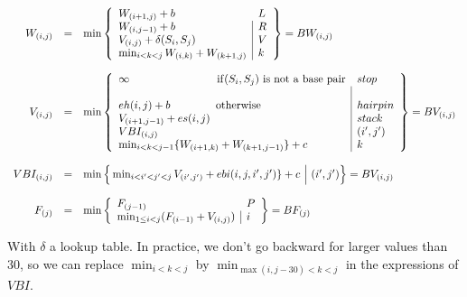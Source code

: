 \[\begin{array}{rcl}
W_{(i,j)}&=&\min\left\{\begin{array}{l|l}
	W_{(i+1,j)}+b & L\\
	W_{(i,j-1)}+b & R\\
	V_{(i,j)}+\delta(S_i,S_j) & V \\
	\min_{i<k<j}W_{(i,k)}+W_{(k+1,j)} &k
\end{array}\right\} = BW_{(i,j)}\\
\\
V_{(i,j)}&=&\min\left\{\begin{array}{l|l}
	\infty \qquad\qquad\qquad\qquad {\rm if}(S_i,S_j) \text{ is not a base pair} & stop\\\\
	eh(i,j)+b \qquad\qquad\, \text{otherwise} & hairpin\\
	V_{(i+1,j-1)}+es(i,j) & stack \\
	VBI_{(i,j)} & (i',j') \\
	\min_{i<k<j-1}\{W_{(i+1,k)}+W_{(k+1,j-1)}\} +c & k
\end{array}\right\} = BV_{(i,j)}\\
\\
VBI_{(i,j)}&=&\min\Big\{\min_{i<i'<j'<j}V_{(i',j')}+ebi(i,j,i',j')\} +c \,\,\Big|\,\, (i',j') \Big\}=BV_{(i,j)}\\
\\
F_{(j)}&=&\min\left\{\begin{array}{l|l}
	F_{(j-1)} & P \\ 
	\min_{1\le i< j} (F_{(i-1)} + V_{(i,j)}) & i
\end{array}\right\} = BF_{(j)}
\end{array}\]

With $\delta$ a lookup table. In practice, we don't go backward for larger values than 30, so we can replace $\min_{i<k<j}$ by $\min_{\max(i,j-30)<k<j}$ in the expressions of $VBI$.

